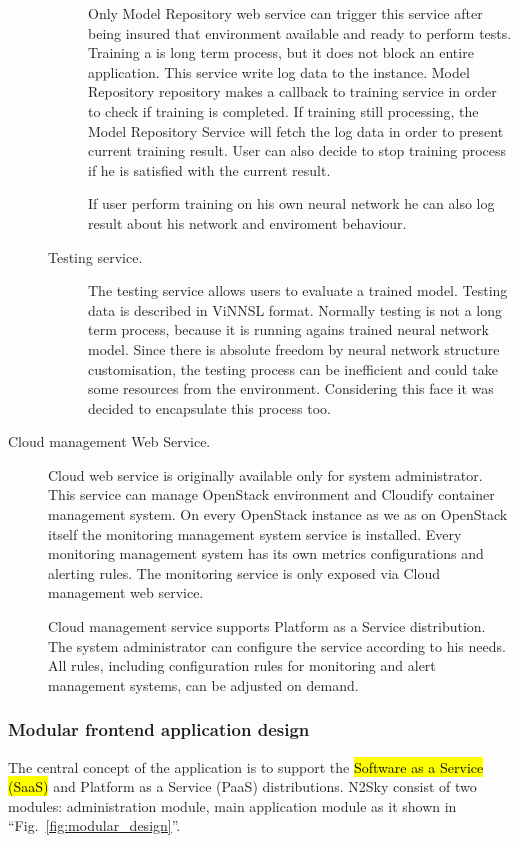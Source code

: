 \begin{description}
\begin{description}
Only Model Repository web service can trigger this service after being insured that environment available and ready to perform tests. Training a is long term process, but it does not block an entire application. This service write log data to the instance. Model Repository repository makes a callback to training service in order to check if training is completed. If training still processing, the Model Repository Service will fetch the log data in order to present current training result. User can also decide to stop training process if he is satisfied with the current result.

If user perform training on his own neural network he can also log result about his network and enviroment behaviour. 
\item[Testing service.] The testing service allows users to evaluate a trained model.  Testing data is described in ViNNSL format. Normally testing is not a long term process, because it is running agains trained neural network model. Since there is absolute freedom by neural network structure customisation, the testing process can be inefficient and could take some resources from the environment. Considering this face it was decided to encapsulate this process too. 
\end{description}

 \item[Cloud management Web Service.]  Cloud web service is originally available only for system administrator. This service can manage OpenStack environment and Cloudify container management system. On every OpenStack instance as we as on OpenStack itself the monitoring management system service is installed. Every monitoring management system has its own metrics configurations and alerting rules. The monitoring service is only exposed via Cloud management web service. 
 
 Cloud management service supports Platform as a Service distribution. The system administrator can configure the service according to his needs. All rules, including configuration rules for monitoring and alert management systems, can be adjusted on demand.  


\end{description}



 
 
\subsubsection{Modular frontend application design}
The central concept of the application is to support the \hl{Software as a Service (SaaS)} and Platform as a Service (PaaS) distributions.  N2Sky consist of two modules: administration module, main application module as it shown in ``Fig.~\ref{fig:modular_design}''.

